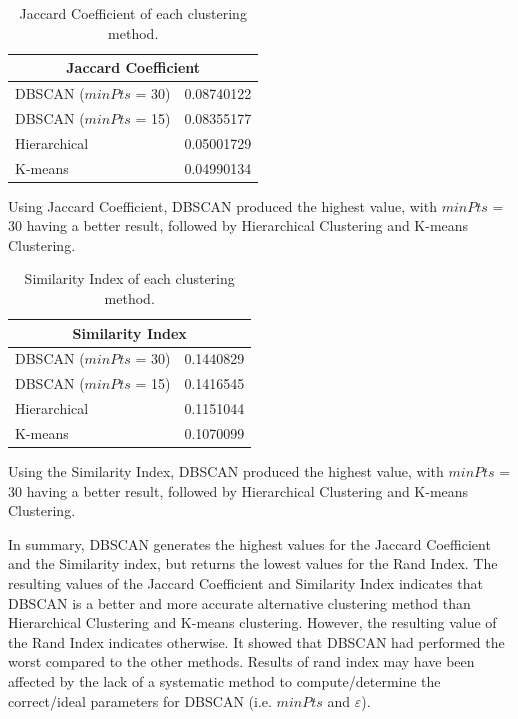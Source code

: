 \documentclass[sigconf,authordraft]{acmart}
\begin{document}
\begin{table}[H]
\begin{center}
\begin{tabular}{|l|r|}
\hline
\multicolumn{2}{|c|}{Jaccard Coefficient} \tabularnewline
\hline
DBSCAN ($minPts$ = 30) & 0.08740122 \\
\hline
DBSCAN ($minPts$ = 15) & 0.08355177 \\
\hline
Hierarchical & 0.05001729 \\
\hline
K-means & 0.04990134 \\
\hline
\end{tabular}
\end{center}
\caption{Jaccard Coefficient of each clustering method.}
\end{table}

Using Jaccard Coefficient, DBSCAN produced the highest value, with $minPts$ = 30 having a better result, followed by Hierarchical Clustering and K-means Clustering.

\begin{table}[H]
\begin{center}
\begin{tabular}{|l|r|}
\hline
\multicolumn{2}{|c|}{Similarity Index} \tabularnewline
\hline
DBSCAN ($minPts$ = 30) & 0.1440829 \\
\hline
DBSCAN ($minPts$ = 15) & 0.1416545 \\
\hline
Hierarchical & 0.1151044 \\
\hline
K-means & 0.1070099 \\
\hline
\end{tabular}
\end{center}
\caption{Similarity Index of each clustering method.}
\end{table}

Using the Similarity Index, DBSCAN produced the highest value, with $minPts$ = 30 having a better result, followed by Hierarchical Clustering and K-means Clustering.

In summary, DBSCAN generates the highest values for the Jaccard Coefficient and the Similarity index, but returns the lowest values for the Rand Index. The resulting values of the Jaccard Coefficient and Similarity Index indicates that DBSCAN is a better and more accurate alternative clustering method than Hierarchical Clustering and K-means clustering. However, the resulting value of the Rand Index indicates otherwise. It showed that DBSCAN had performed the worst compared to the other methods. Results of rand index may have been affected by the lack of a systematic method to compute/determine the correct/ideal parameters for DBSCAN (i.e. $minPts$ and $\varepsilon$).
\end{document}
